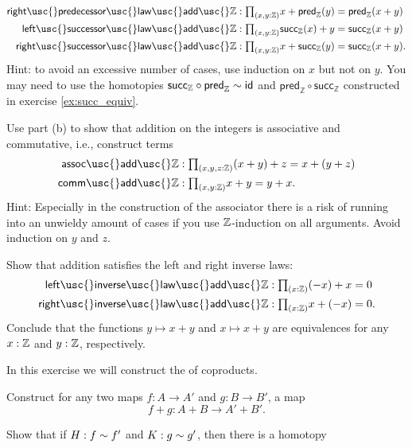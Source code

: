 \begin{exercises}
\begin{subexenum}
\begin{align*}
\mathsf{right\usc{}predecessor\usc{}law\usc{}add\usc{}}\Z & : \prd{x,y:\Z} x+\mathsf{pred}_{\mathbb{Z}}(y) = \mathsf{pred}_{\mathbb{Z}}(x+y) \\
\mathsf{left\usc{}successor\usc{}law\usc{}add\usc{}}\Z & : \prd{x,y:\Z} \mathsf{succ}_{\mathbb{Z}}(x)+y = \mathsf{succ}_{\mathbb{Z}}(x+y) \\
\mathsf{right\usc{}successor\usc{}law\usc{}add\usc{}}\Z & : \prd{x,y:\Z} x+\mathsf{succ}_{\mathbb{Z}}(y) = \mathsf{succ}_{\mathbb{Z}}(x+y).
\end{align*}
Hint: to avoid an excessive number of cases, use induction on $x$ but not on $y$. You may need to use the homotopies $\mathsf{succ}_{\mathbb{Z}}\circ \mathsf{pred}_{\mathbb{Z}}\sim \mathsf{id}_{}$ and $\mathsf{pred}_{\mathbb{Z}}\circ\mathsf{succ}_{\mathbb{Z}}$ constructed in exercise \cref{ex:succ_equiv}.
\item Use part (b) to show that addition on the integers is associative and commutative, i.e., construct terms
\begin{align*}
\mathsf{assoc\usc{}add\usc{}}\Z & : \prd{x,y,z:\Z} (x+y)+z = x + (y+z) \\
\mathsf{comm\usc{}add\usc{}}\Z & : \prd{x,y:\Z} x+y = y+x.
\end{align*}
Hint: Especially in the construction of the associator there is a risk of running into an unwieldy amount of cases if you use $\mathbb{Z}$-induction on all arguments. Avoid induction on $y$ and $z$.
\item Show that addition satisfies the left and right inverse laws:
\begin{align*}
\mathsf{left\usc{}inverse\usc{}law\usc{}add\usc{}}\Z & : \prd{x : \Z} (-x)+x=0 \\
\mathsf{right\usc{}inverse\usc{}law\usc{}add\usc{}}\Z & : \prd{x : \Z} x + (-x)=0.
\end{align*}
Conclude that the functions $y \mapsto x + y$ and $x\mapsto x + y$ are equivalences for any $x:\mathbb{Z}$ and $y:\mathbb{Z}$, respectively.
\end{subexenum}
\item \label{ex:coproduct_functor}In this exercise we will construct the  of coproducts.
\begin{subexenum}
\item Construct for any two maps $f:A \to A'$ and $g:B \to B'$, a map
\begin{equation*}
f+g:A+B \to A'+B'.
\end{equation*}
\item Show that if $H:f\sim f'$ and $K:g\sim g'$, then there is a homotopy

\end{subexenum}
\end{exercises}

